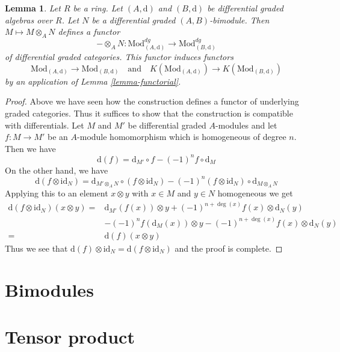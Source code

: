 \documentclass{stacks-project}
\theoremstyle{plain}
\newtheorem{lemma}[subsection]{Lemma}
\theoremstyle{definition}
\theoremstyle{remark}
\numberwithin{equation}{subsection}
\begin{document}
\begin{lemma}
\label{lemma-tensor}
Let $R$ be a ring. Let $(A, \text{d})$ and $(B, \text{d})$
be differential graded algebras over $R$. Let $N$ be a
differential graded $(A, B)$-bimodule. Then
$M \mapsto M \otimes_A N$ defines a functor
$$
- \otimes_A N :
\text{Mod}^{dg}_{(A, \text{d})}
\longrightarrow
\text{Mod}^{dg}_{(B, \text{d})}
$$
of differential graded categories. This functor induces functors
$$
\text{Mod}_{(A, \text{d})} \to \text{Mod}_{(B, \text{d})}
\quad\text{and}\quad
K(\text{Mod}_{(A, \text{d})}) \to K(\text{Mod}_{(B, \text{d})})
$$
by an application of Lemma \ref{lemma-functorial}.
\end{lemma}

\begin{proof}
Above we have seen how the construction defines a functor of underlying
graded categories. Thus it suffices to show that the construction is
compatible with differentials. Let $M$ and $M'$ be differential
graded $A$-modules and let $f : M \to M'$ be an $A$-module homomorphism
which is homogeneous of degree $n$. Then we have
$$
\text{d}(f) = \text{d}_{M'} \circ f - (-1)^n f \circ \text{d}_M
$$
On the other hand, we have
$$
\text{d}(f \otimes \text{id}_N) =
\text{d}_{M' \otimes_A N} \circ
(f \otimes \text{id}_N)
- (-1)^n
(f \otimes \text{id}_N) \circ \text{d}_{M \otimes_A N}
$$
Applying this to an element $x \otimes y$ with $x \in M$ and
$y \in N$ homogeneous we get
\begin{align*}
\text{d}(f \otimes \text{id}_N)(x \otimes y)
= &
\text{d}_{M'}(f(x)) \otimes y + (-1)^{n + \deg(x)}f(x) \otimes \text{d}_N(y) \\
& - (-1)^n f(\text{d}_M(x)) \otimes y
- (-1)^{n + \deg(x)}f(x) \otimes \text{d}_N(y) \\
= &
\text{d}(f) (x \otimes y)
\end{align*}
Thus we see that $\text{d}(f) \otimes \text{id}_N =
\text{d}(f \otimes \text{id}_N)$ and the proof is complete.
\end{proof}

\section{Bimodules}
\label{section-bimodules}

\section{Tensor product}
\label{section-tensor-product}
\end{document}
